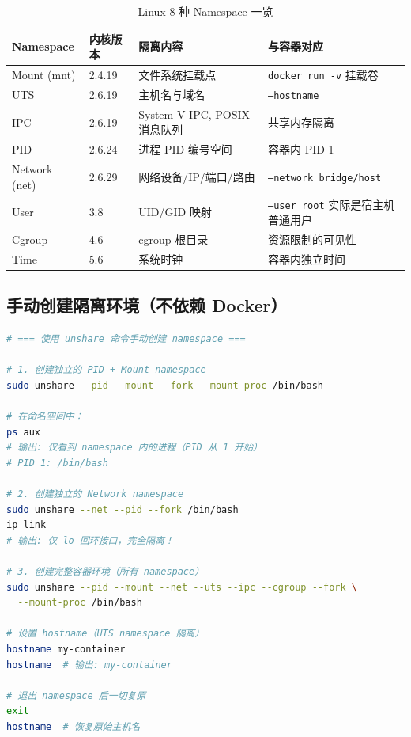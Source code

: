 \documentclass[12pt,UTF8]{ctexbook}
\begin{document}
\begin{table}[h]
\centering
\caption{Linux 8 种 Namespace 一览}
\begin{tabular}{|p{2.2cm}|p{1.2cm}|p{3.5cm}|p{5cm}|}
\hline
\textbf{Namespace} & \textbf{内核版本} & \textbf{隔离内容} & \textbf{与容器对应} \\
\hline
Mount (mnt) & 2.4.19 & 文件系统挂载点 & \texttt{docker run -v} 挂载卷 \\
\hline
UTS & 2.6.19 & 主机名与域名 & \texttt{--hostname} \\
\hline
IPC & 2.6.19 & System V IPC, POSIX 消息队列 & 共享内存隔离 \\
\hline
PID & 2.6.24 & 进程 PID 编号空间 & 容器内 PID 1 \\
\hline
Network (net) & 2.6.29 & 网络设备/IP/端口/路由 & \texttt{--network bridge/host} \\
\hline
User & 3.8 & UID/GID 映射 & \texttt{--user root} 实际是宿主机普通用户 \\
\hline
Cgroup & 4.6 & cgroup 根目录 & 资源限制的可见性 \\
\hline
Time & 5.6 & 系统时钟 & 容器内独立时间 \\
\hline
\end{tabular}
\end{table}

\subsection{手动创建隔离环境（不依赖 Docker）}

\begin{lstlisting}[language=bash]
# === 使用 unshare 命令手动创建 namespace ===

# 1. 创建独立的 PID + Mount namespace
sudo unshare --pid --mount --fork --mount-proc /bin/bash

# 在命名空间中：
ps aux
# 输出: 仅看到 namespace 内的进程（PID 从 1 开始）
# PID 1: /bin/bash

# 2. 创建独立的 Network namespace
sudo unshare --net --pid --fork /bin/bash
ip link
# 输出: 仅 lo 回环接口，完全隔离！

# 3. 创建完整容器环境（所有 namespace）
sudo unshare --pid --mount --net --uts --ipc --cgroup --fork \
  --mount-proc /bin/bash

# 设置 hostname（UTS namespace 隔离）
hostname my-container
hostname  # 输出: my-container

# 退出 namespace 后一切复原
exit
hostname  # 恢复原始主机名
\end{lstlisting}
\end{document}
